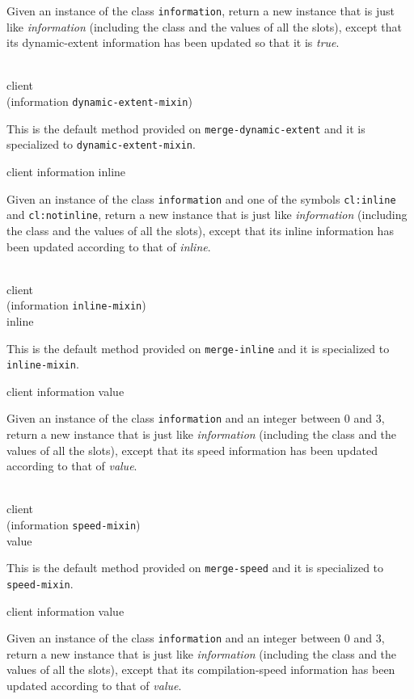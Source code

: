 Given an instance of the class \texttt{information}, return a
new instance that is just like \textit{information}
(including the class and the values of all the slots), except that its
dynamic-extent information has been updated so that it is \emph{true}.

\\
           {client\\
            (information {\tt dynamic-extent-mixin})}

This is the default method provided on
\texttt{merge-dynamic-extent} and it is specialized to
\texttt{dynamic-extent-mixin}.

 {client information inline}

Given an instance of the class \texttt{information} and one
of the symbols \texttt{cl:inline} and \texttt{cl:notinline},
return a new instance that is just like
\textit{information} (including the class and the values of
all the slots), except that its inline information has been updated
according to that of \textit{inline}.

\\
           {client\\
            (information {\tt inline-mixin})\\
            inline}

This is the default method provided on \texttt{merge-inline}
and it is specialized to \texttt{inline-mixin}.

 {client information value}

Given an instance of the class \texttt{information} and an
integer between $0$ and $3$, return a new instance that is just like
\textit{information} (including the class and the values of
all the slots), except that its speed information has been updated
according to that of \textit{value}.

\\
           {client\\
            (information {\tt speed-mixin})\\
            value}

This is the default method provided on \texttt{merge-speed} and it is
specialized to \texttt{speed-mixin}.

 {client information value}

Given an instance of the class \texttt{information} and an
integer between $0$ and $3$, return a new instance that is just like
\textit{information} (including the class and the values of
all the slots), except that its compilation-speed information has been
updated according to that of \textit{value}.

